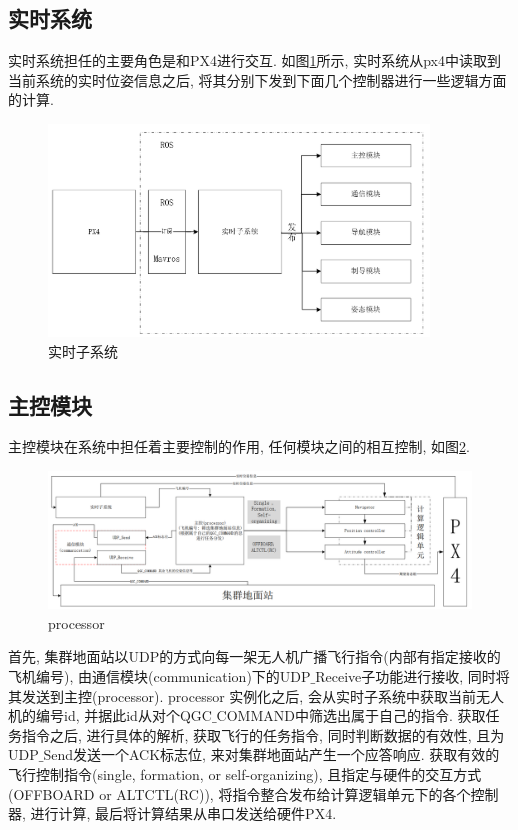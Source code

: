 \subsection{实时系统}
    实时系统担任的主要角色是和PX4进行交互. 如图\ref{fig:msgsubandpub}所示, 实时系统从px4中读取到当前系统的实时位姿信息之后, 将其分别下发到下面几个控制器进行一些逻辑方面的计算. 
    \begin{figure}[htbp]
        \centering
        \includegraphics[width=0.9\textwidth]{pictures/system_2.png}
        \caption{实时子系统}
    \label{fig:msgsubandpub}
  \end{figure}
\subsection{主控模块}
    主控模块在系统中担任着主要控制的作用, 任何模块之间的相互控制, 如图\ref{fig:processor}. \par
    \begin{figure}[htbp]
        \centering
        \includegraphics[width=\textwidth]{pictures/processor.png}
        \caption{processor}
        \label{fig:processor}
    \end{figure}
    首先, 集群地面站以UDP的方式向每一架无人机广播飞行指令(内部有指定接收的飞机编号), 由通信模块(communication)下的UDP$\_$Receive子功能进行接收, 同时将其发送到主控(processor). 
    processor 实例化之后, 会从实时子系统中获取当前无人机的编号id, 并据此id从对个QGC$\_$COMMAND中筛选出属于自己的指令. 
    获取任务指令之后, 进行具体的解析, 获取飞行的任务指令, 同时判断数据的有效性, 且为UDP$\_$Send发送一个ACK标志位, 来对集群地面站产生一个应答响应. 
    获取有效的飞行控制指令(single, formation, or self-organizing), 且指定与硬件的交互方式(OFFBOARD or ALTCTL(RC)), 
    将指令整合发布给计算逻辑单元下的各个控制器, 进行计算, 最后将计算结果从串口发送给硬件PX4. 
    
